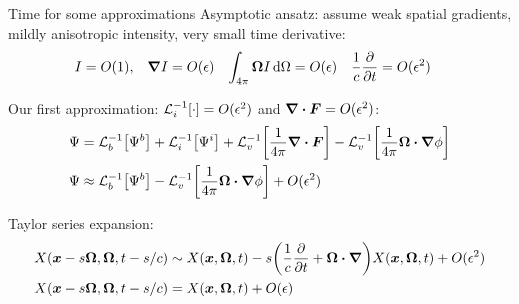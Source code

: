 \documentclass{beamer}
\begin{document}
\begin{frame}{Time for some approximations}
  Asymptotic ansatz: assume weak spatial gradients, mildly anisotropic intensity, very small time
  derivative:
\begin{align*}
  I &= O(1), &
  \bm{\nabla} I &= O(\epsilon)&
  \int_{4\pi} \bm{\Omega} I\mathop{}\!\mathrm{d} \Omega &= O(\epsilon)&
  \frac{1}{c} \frac{\partial }{\partial t} &= O(\epsilon^2)
\end{align*}

Our first approximation: $\mathcal{L}_{i}^{-1}\!\left[\cdot\right] = O(\epsilon^2)$ and $\bm{\nabla} \bm{\cdot} \bm{F} =
O(\epsilon^2)$:
\begin{align*}
  \Psi &= \mathcal{L}_{b}^{-1}\!\left[\Psi^b\right] + \mathcal{L}_{i}^{-1}\!\left[\Psi^i\right]
  + \mathcal{L}_{v}^{-1}\!\left[\frac{1}{4\pi} \bm{\nabla} \bm{\cdot}\bm{F}\right] -
  \mathcal{L}_{v}^{-1}\!\left[\frac{1}{4\pi} \bm{\Omega}\bm{\cdot} \bm{\nabla} \phi\right]
    \\ 
  \Psi 
  &\approx \mathcal{L}_{b}^{-1}\!\left[\Psi^b\right] - \mathcal{L}_{v}^{-1}\!\left[\frac{1}{4\pi} \bm{\Omega}\bm{\cdot} \bm{\nabla} \phi\right]
  + O(\epsilon^2)
\end{align*}

Taylor series expansion:
\begin{align} \nonumber
  X(\bm{x} - s\bm{\Omega}, \bm{\Omega}, t - s/c)
  &\sim X(\bm{x}, \bm{\Omega}, t)
  - s \bigg( \frac{1}{c} \frac{\partial }{\partial t} + \bm{\Omega} \bm{\cdot} \bm{\nabla} \bigg)
  X(\bm{x}, \bm{\Omega}, t) + O(\epsilon^2)
\\ \label{eq:taylorPhi}
X(\bm{x} - s\bm{\Omega}, \bm{\Omega}, t - s/c)
&= X(\bm{x}, \bm{\Omega}, t) + O(\epsilon)
\end{align}
\end{frame}
\end{document}
